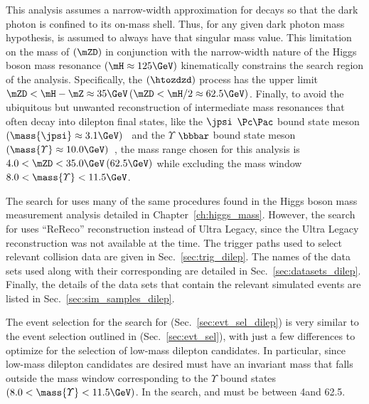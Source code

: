 This analysis assumes a narrow-width approximation for \PZD decays so that the dark photon is confined to its on-mass shell.
Thus, for any given dark photon mass hypothesis, \PZD is assumed to always have that singular mass value.
This limitation on the mass of \PZD $\left(\mZD\right)$ in conjunction with the narrow-width nature of the Higgs boson mass resonance $\left( \mH \approx 125\GeV \right)$ kinematically constrains the search region of the analysis.
Specifically, the \htozzd $\left(\htozdzd\right)$ process has the upper limit
$\mZD < \mH - \mZ \approx 35\GeV    \left(\mZD < \mH / 2 \approx 62.5\GeV\right)$.
Finally, to avoid the ubiquitous but unwanted reconstruction of intermediate mass resonances that often decay into dilepton final states,
like the $\jpsi$ $\Pc\Pac$ bound state meson $\left( \mass{\jpsi} \approx 3.1\GeV \right)$~\cite{particle_data_group_review_2020}
and the $\varUpsilon$ $\bbbar$ bound state meson $\left( \mass{\varUpsilon} \approx 10.0\GeV \right)$~\cite{particle_data_group_review_2020},
the mass range chosen for this analysis is $4.0 < \mZD < 35.0\GeV \left(62.5\GeV\right)$ while excluding the mass window $8.0 < \mass{\varUpsilon} < 11.5\GeV$.

The search for \PZD uses many of the same procedures found in the Higgs boson mass measurement analysis detailed in Chapter~\ref{ch:higgs_mass}.
However, the search for \PZD uses ``ReReco'' reconstruction instead of Ultra Legacy, since the Ultra Legacy reconstruction was not available at the time.
The trigger paths used to select relevant \pp collision data are given in Sec.~\ref{sec:trig_dilep}.
The names of the data sets used along with their corresponding \lumiint are detailed in Sec.~\ref{sec:datasets_dilep}.
Finally, the details of the data sets that contain the relevant simulated events are listed in Sec.~\ref{sec:sim_samples_dilep}.

The event selection for the search for \PZD (Sec.~\ref{sec:evt_sel_dilep}) is very similar to the event selection outlined in (Sec.~\ref{sec:evt_sel}), with just a few differences to optimize for the selection of low-mass dilepton candidates.
In particular, since low-mass dilepton candidates are desired must have an invariant mass that falls outside the mass window corresponding to the $\varUpsilon$ \bbbar bound states $\left( 8.0 < \mass{\varUpsilon} < 11.5\GeV \right)$. 
In the \zdzd search, \mZone and \mZtwo must be between 4\GeV and 62.5\GeV.

